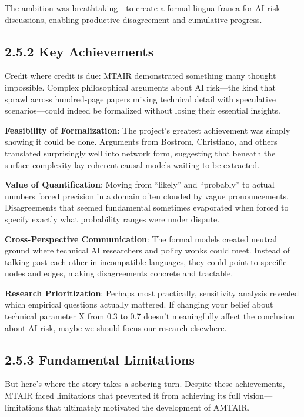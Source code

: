 \documentclass[
  11pt,
  letterpaper,
]{book}
\begin{document}
The ambition was breathtaking---to create a formal lingua franca for AI
risk discussions, enabling productive disagreement and cumulative
progress.

\subsection{2.5.2 Key Achievements}\label{sec-mtair-achievements}

Credit where credit is due: MTAIR demonstrated something many thought
impossible. Complex philosophical arguments about AI risk---the kind
that sprawl across hundred-page papers mixing technical detail with
speculative scenarios---could indeed be formalized without losing their
essential insights.

\textbf{Feasibility of Formalization}: The project's greatest
achievement was simply showing it could be done. Arguments from Bostrom,
Christiano, and others translated surprisingly well into network form,
suggesting that beneath the surface complexity lay coherent causal
models waiting to be extracted.

\textbf{Value of Quantification}: Moving from ``likely'' and
``probably'' to actual numbers forced precision in a domain often
clouded by vague pronouncements. Disagreements that seemed fundamental
sometimes evaporated when forced to specify exactly what probability
ranges were under dispute.

\textbf{Cross-Perspective Communication}: The formal models created
neutral ground where technical AI researchers and policy wonks could
meet. Instead of talking past each other in incompatible languages, they
could point to specific nodes and edges, making disagreements concrete
and tractable.

\textbf{Research Prioritization}: Perhaps most practically, sensitivity
analysis revealed which empirical questions actually mattered. If
changing your belief about technical parameter X from 0.3 to 0.7 doesn't
meaningfully affect the conclusion about AI risk, maybe we should focus
our research elsewhere.

\subsection{2.5.3 Fundamental Limitations}\label{sec-mtair-limitations}

But here's where the story takes a sobering turn. Despite these
achievements, MTAIR faced limitations that prevented it from achieving
its full vision---limitations that ultimately motivated the development
of AMTAIR.
\end{document}
